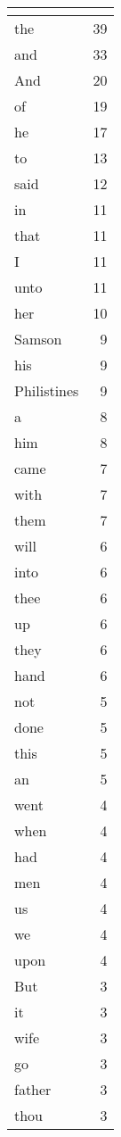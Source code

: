 \begin{center}
\begin{longtable}{l|r}
\hline \multicolumn{2}{c}{{ }} \\ \hline
\endfoot 
the & 39\\ \hline 
and & 33\\ \hline 
And & 20\\ \hline 
of & 19\\ \hline 
he & 17\\ \hline 
to & 13\\ \hline 
said & 12\\ \hline 
in & 11\\ \hline 
that & 11\\ \hline 
I & 11\\ \hline 
unto & 11\\ \hline 
her & 10\\ \hline 
Samson & 9\\ \hline 
his & 9\\ \hline 
Philistines & 9\\ \hline 
a & 8\\ \hline 
him & 8\\ \hline 
came & 7\\ \hline 
with & 7\\ \hline 
them & 7\\ \hline 
will & 6\\ \hline 
into & 6\\ \hline 
thee & 6\\ \hline 
up & 6\\ \hline 
they & 6\\ \hline 
hand & 6\\ \hline 
not & 5\\ \hline 
done & 5\\ \hline 
this & 5\\ \hline 
an & 5\\ \hline 
went & 4\\ \hline 
when & 4\\ \hline 
had & 4\\ \hline 
men & 4\\ \hline 
us & 4\\ \hline 
we & 4\\ \hline 
upon & 4\\ \hline 
But & 3\\ \hline 
it & 3\\ \hline 
wife & 3\\ \hline 
go & 3\\ \hline 
father & 3\\ \hline 
thou & 3\\ \hline 

\end{longtable}
\end{center}
